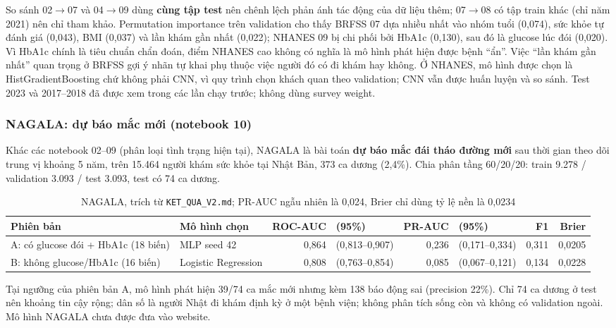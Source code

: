 So sánh 02$\rightarrow$07 và 04$\rightarrow$09 dùng \textbf{cùng tập test} nên chênh lệch phản ánh tác động của dữ liệu thêm; 07$\rightarrow$08 có tập train khác (chỉ năm 2021) nên chỉ tham khảo. Permutation importance trên validation cho thấy BRFSS 07 dựa nhiều nhất vào nhóm tuổi (0,074), sức khỏe tự đánh giá (0,043), BMI (0,037) và lần khám gần nhất (0,022); NHANES 09 bị chi phối bởi HbA1c (0,130), sau đó là glucose lúc đói (0,020). Vì HbA1c chính là tiêu chuẩn chẩn đoán, điểm NHANES cao không có nghĩa là mô hình phát hiện được bệnh “ẩn”. Việc “lần khám gần nhất” quan trọng ở BRFSS gợi ý nhãn tự khai phụ thuộc việc người đó có đi khám hay không. Ở NHANES, mô hình được chọn là HistGradientBoosting chứ không phải CNN, vì quy trình chọn khách quan theo validation; CNN vẫn được huấn luyện và so sánh. Test 2023 và 2017--2018 đã được xem trong các lần chạy trước; không dùng survey weight.

\subsubsection{NAGALA: dự báo mắc mới (notebook 10)}
Khác các notebook 02--09 (phân loại tình trạng hiện tại), NAGALA là bài toán \textbf{dự báo mắc đái tháo đường mới} sau thời gian theo dõi trung vị khoảng 5 năm, trên 15.464 người khám sức khỏe tại Nhật Bản, 373 ca dương (2,4\%). Chia phân tầng 60/20/20: train 9.278 / validation 3.093 / test 3.093, test có 74 ca dương.
\begin{table}[H]\centering\footnotesize\setlength{\tabcolsep}{4pt}
\begin{tabularx}{\linewidth}{>{\raggedright\arraybackslash}X>{\raggedright\arraybackslash}p{2.2cm}rlrlrr}\toprule
Phiên bản & Mô hình chọn & ROC-AUC & (95\%) & PR-AUC & (95\%) & F1 & Brier\\\midrule
A: có glucose đói + HbA1c (18 biến) & MLP seed 42 & 0,864 & (0,813--0,907) & 0,236 & (0,171--0,334) & 0,311 & 0,0205\\
B: không glucose/HbA1c (16 biến) & Logistic Regression & 0,808 & (0,763--0,854) & 0,085 & (0,067--0,121) & 0,134 & 0,0228\\\bottomrule
\end{tabularx}\caption{NAGALA, trích từ \texttt{KET\_QUA\_V2.md}; PR-AUC ngẫu nhiên là 0,024, Brier chỉ dùng tỷ lệ nền là 0,0234}\end{table}
Tại ngưỡng của phiên bản A, mô hình phát hiện 39/74 ca mắc mới nhưng kèm 138 báo động sai (precision 22\%). Chỉ 74 ca dương ở test nên khoảng tin cậy rộng; dân số là người Nhật đi khám định kỳ ở một bệnh viện; không phân tích sống còn và không có validation ngoài. Mô hình NAGALA chưa được đưa vào website.

